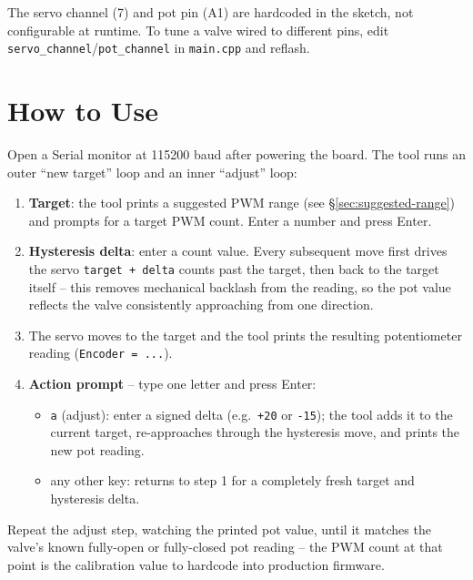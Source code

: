 \documentclass[11pt,letterpaper]{article}
\begin{document}
\begin{notebox}
The servo channel (7) and pot pin (A1) are hardcoded in the sketch, not
configurable at runtime. To tune a valve wired to different pins, edit
\texttt{servo\_channel}/\texttt{pot\_channel} in \texttt{main.cpp} and
reflash.
\end{notebox}

\section{How to Use}

Open a Serial monitor at 115200 baud after powering the board. The tool
runs an outer ``new target'' loop and an inner ``adjust'' loop:

\begin{enumerate}[nosep]
  \item \textbf{Target}: the tool prints a suggested PWM range (see
        §\ref{sec:suggested-range}) and prompts for a target PWM count.
        Enter a number and press Enter.
  \item \textbf{Hysteresis delta}: enter a count value. Every subsequent
        move first drives the servo \texttt{target~+~delta} counts past
        the target, then back to the target itself -- this removes
        mechanical backlash from the reading, so the pot value reflects
        the valve consistently approaching from one direction.
  \item The servo moves to the target and the tool prints the resulting
        potentiometer reading (\texttt{Encoder = ...}).
  \item \textbf{Action prompt} -- type one letter and press Enter:
        \begin{itemize}[nosep]
          \item \texttt{a} (adjust): enter a signed delta (e.g.\ \texttt{+20}
                or \texttt{-15}); the tool adds it to the current target,
                re-approaches through the hysteresis move, and prints the
                new pot reading.
          \item any other key: returns to step 1 for a completely fresh
                target and hysteresis delta.
        \end{itemize}
\end{enumerate}

Repeat the adjust step, watching the printed pot value, until it matches
the valve's known fully-open or fully-closed pot reading -- the PWM count
at that point is the calibration value to hardcode into production
firmware.
\end{document}
